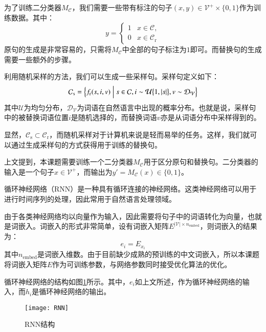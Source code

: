 为了训练二分类器$M_\mathcal{C}$，我们需要一些带有标注的句子$(x, y) \in \mathcal{V}^+ \times \{0, 1\}$作为训练数据。其中：
\begin{equation}
	y = 
	\begin{cases}
		1 & x \in \mathcal{C}, \\
		0 & x \in \mathcal{C}_\text{r}
	\end{cases}
\end{equation}
原句的生成是非常容易的，只需将$M_\mathcal{C}$中全部的句子标注为$1$即可。而替换句的生成需要一些额外的步骤。

利用随机采样的方法，我们可以生成一些采样句。采样句定义如下：
\begin{equation}
\mathcal{C}_\text{s} = \Bigl\{f_\text{r}(s, i, v) \Bigm| s \in \mathcal{C}, i \sim \mathcal{U}\bigl\{1, |s|\bigr\}, v \sim \mathcal{D}_\mathcal{V}\Bigr\}
\end{equation}
其中$\mathcal{U}$为均匀分布，$\mathcal{D}_\mathcal{V}$为词语在自然语言中出现的概率分布。也就是说，采样句中的被替换词语位置$i$是随机选择的，而替换词语$v$亦是从词语分布中采样得到的。

显然，$\mathcal{C}_\text{s} \subset \mathcal{C}_\text{r}$，而随机采样对于计算机来说是轻而易举的任务。这样，我们就可以通过生成采样句的方式获得用于训练的替换句。

\label{s:classifer rnn}
上文提到，本课题需要训练一个二分类器$M_\mathcal{C}$用于区分原句和替换句。二分类器的输入是一个句子$x \in \mathcal{V}^+$，而输出为$y' = M_\mathcal{C}(x) \in \{0, 1\}$。

循环神经网络（RNN）是一种具有循环连接的神经网络。这类神经网络可以用于进行时间序列的处理，因此常用于自然语言处理领域。

由于各类神经网络均以向量作为输入，因此需要将句子中的词语转化为向量，也就是词嵌入。词嵌入的形式非常简单，设有词嵌入矩阵$E^{|\mathcal{V}| \times n_{\text{embed}}}$，则词嵌入的结果为：
\begin{equation}
e_i = E_{x_i}
\end{equation}
其中$n_{\text{embed}}$是词嵌入维数。由于目前缺少成熟的预训练的中文词嵌入，所以本课题将词嵌入矩阵$E$作为可训练参数，与网络参数同时接受优化算法的优化。

循环神经网络的结构如图\ref{f:rnn}所示。其中，$e_i$如上文所述，作为循环神经网络的输入，而$h_i$是循环神经网络的输出。

\begin{figure}[h]
	\centering
	\texttt{[image: RNN]}
	\caption{RNN结构}
	\label{f:rnn}
	\vspace{-1em}
\end{figure}

